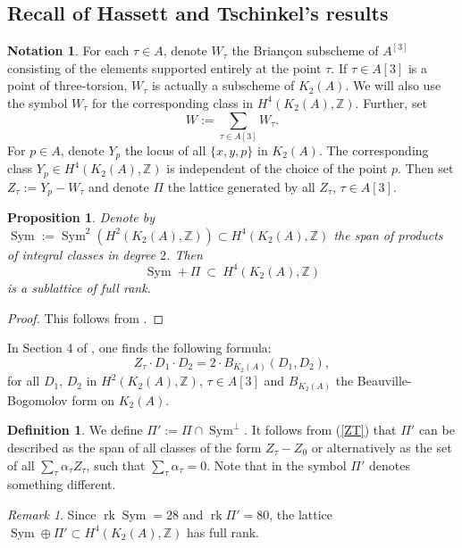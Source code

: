 \documentclass{alggeom}
\DeclareMathOperator{\Sym}{Sym}
\DeclareMathOperator{\rk}{rk}
\newcommand{\hilb}[1]{^{[#1]}}
\newcommand{\kum}[2]{K_{ #2 }( #1 )}
\newcommand{\X}{\kum{A}{2}}
\newcommand{\Z}{\mathbb{Z}}
\theoremstyle{plain}
\newtheorem{proposition}[theorem]{Proposition}
\theoremstyle{definition}
\newtheorem{definition}[theorem]{Definition}
\newtheorem{notation}[theorem]{Notation}
\theoremstyle{remark}
\newtheorem{remark}[theorem]{Remark}
\begin{document}
\subsection{Recall of Hassett and Tschinkel's results}\label{HassetTschinkelSection} \label{Middle}
\begin{notation}\label{TheZs}
For each $\tau \in A$, denote $W_\tau$ the Brian\c con subscheme of $A\hilb{3}$ consisting of the elements supported entirely at the point $\tau$. If $\tau\in A[3]$ is a point of three-torsion, $W_\tau$ is actually a subscheme of $\X$. We will also use the symbol $W_\tau$ for the corresponding class in $H^4(\X,\Z)$. Further, set 
$$
W := \sum_{\tau\in A[3]} W_\tau.
$$
For $p\in A$, denote $Y_p$ the locus of all $\{x,y,p\}$ in $\X$. The corresponding class $Y_p \in H^4(\X,\Z)$ is independent of the choice of the point $p$. Then set $Z_\tau := Y_p - W_\tau$ and denote $\Pi$ the lattice generated by all $Z_\tau$, $\tau \in A[3]$.
\end{notation}
\begin{proposition}
Denote by $\Sym := \Sym^2\left(H^2\left(\X,\Z\right)\right) \subset H^4\left(\X,\Z\right) $ the span of products of integral classes in degree $2$.
Then 
$$
\Sym+\Pi \ \subset\  H^4\left(\X,\Z\right)
$$
is a sublattice  of full rank.  
\end{proposition}
\begin{proof}
This follows from \cite[Proposition 4.3]{Hassett}.
\end{proof}

In Section 4 of \cite{Hassett}, one finds the following formula:
\begin{equation}
Z_{\tau}\cdot D_{1}\cdot D_{2}=2\cdot B_{\X}(D_{1},D_{2}),
\label{ZT}
\end{equation}
for all $D_{1}$, $D_{2}$ in $H^{2}(\X,\Z)$, $\tau\in A[3]$ and $B_{\X}$ the Beauville-Bogomolov form on $\X$.

\begin{definition}\label{defiPi}
We define $\Pi' := \Pi \cap \Sym^{\perp}$. It follows from (\ref{ZT}) that $\Pi'$ can be described as the span of all classes of the form $Z_\tau -Z_0$ or alternatively as the set of all
$
\sum_\tau \alpha_\tau Z_\tau $, such that $ \sum_\tau \alpha_\tau =0$.
Note that in \cite{Hassett} the symbol $\Pi'$ denotes something different.
\end{definition}
\begin{remark}
Since $\rk \Sym = 28$ and $\rk \Pi' = 80$, the lattice $\Sym\oplus\Pi'\subset H^4\left(\X,\Z\right)$ has full rank.
\end{remark}
\end{document}
